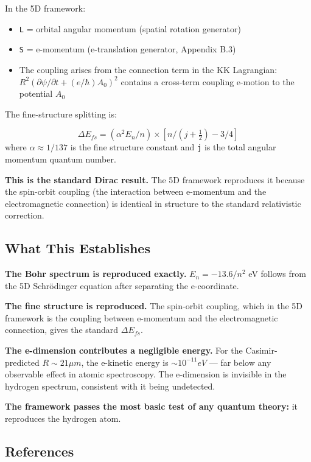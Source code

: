 \documentclass[aps,prd,preprint,superscriptaddress,longbibliography,floatfix]{revtex4-2}
\theoremstyle{remark}
\begin{document}
In the 5D framework:

\begin{itemize}
  \item \texttt{L} = orbital angular momentum (spatial rotation generator)
  \item \texttt{S} = e-momentum (e-translation generator, Appendix B.3)
  \item The coupling arises from the connection term in the KK Lagrangian: $R^{2}(\partial\psi/\partial t + (e/\hbar)A_{0})^{2}$ contains a cross-term coupling e-motion to the potential $A_{0}$
\end{itemize}

The fine-structure splitting is:


\begin{equation}
    \Delta E_{fs} = (\alpha^{2} E_n / n) \times [n/(j + \tfrac{1}{2}) - 3/4]
\end{equation}
where $\alpha \approx 1/137$ is the fine structure constant and \texttt{j} is the total angular momentum quantum number.

\textbf{This is the standard Dirac result.} The 5D framework reproduces it because the spin-orbit coupling (the interaction between e-momentum and the electromagnetic connection) is identical in structure to the standard relativistic correction.


\subsection{What This Establishes}

\textbf{The Bohr spectrum is reproduced exactly.} $E_n = -13.6/n^{2}$ eV follows from the 5D Schr\"{o}dinger equation after separating the e-coordinate.

\textbf{The fine structure is reproduced.} The spin-orbit coupling, which in the 5D framework is the coupling between e-momentum and the electromagnetic connection, gives the standard $\Delta E_{fs}$.

\textbf{The e-dimension contributes a negligible energy.} For the Casimir-predicted $R \sim  21 \mu m$, the e-kinetic energy is $\sim 10^{-11} eV$ --- far below any observable effect in atomic spectroscopy. The e-dimension is invisible in the hydrogen spectrum, consistent with it being undetected.

\textbf{The framework passes the most basic test of any quantum theory:} it reproduces the hydrogen atom.



\subsection{References}
\end{document}
